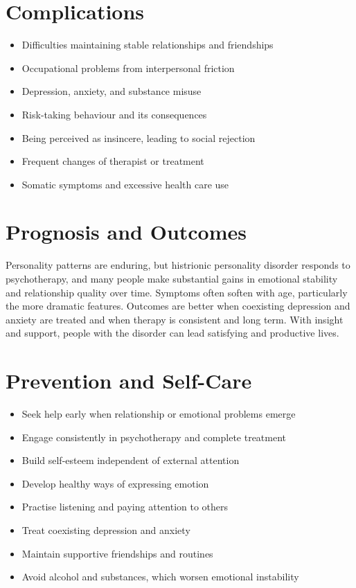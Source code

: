 \section*{Complications}
\begin{itemize}
    \item Difficulties maintaining stable relationships and friendships
    \item Occupational problems from interpersonal friction
    \item Depression, anxiety, and substance misuse
    \item Risk-taking behaviour and its consequences
    \item Being perceived as insincere, leading to social rejection
    \item Frequent changes of therapist or treatment
    \item Somatic symptoms and excessive health care use
\end{itemize}

\section*{Prognosis and Outcomes}
Personality patterns are enduring, but histrionic personality disorder responds to psychotherapy, and many people make substantial gains in emotional stability and relationship quality over time. Symptoms often soften with age, particularly the more dramatic features. Outcomes are better when coexisting depression and anxiety are treated and when therapy is consistent and long term. With insight and support, people with the disorder can lead satisfying and productive lives.

\section*{Prevention and Self-Care}
\begin{itemize}
    \item Seek help early when relationship or emotional problems emerge
    \item Engage consistently in psychotherapy and complete treatment
    \item Build self-esteem independent of external attention
    \item Develop healthy ways of expressing emotion
    \item Practise listening and paying attention to others
    \item Treat coexisting depression and anxiety
    \item Maintain supportive friendships and routines
    \item Avoid alcohol and substances, which worsen emotional instability
\end{itemize}

